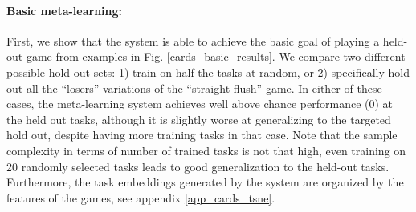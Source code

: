 \documentclass{article}
\begin{document}
\paragraph{Basic meta-learning:} First, we show that the system is able to achieve the basic goal of playing a held-out game from examples in Fig. \ref{cards_basic_results}. We compare two different possible hold-out sets: 1) train on half the tasks at random, or 2) specifically hold out all the ``losers'' variations of the ``straight flush'' game. In either of these cases, the meta-learning system achieves well above chance performance (0) at the held out tasks, although it is slightly worse at generalizing to the targeted hold out, despite having more training tasks in that case. Note that the sample complexity in terms of number of trained tasks is not that high, even training on 20 randomly selected tasks leads to good generalization to the held-out tasks. Furthermore, the task embeddings generated by the system are organized by the features of the games, see appendix \ref{app_cards_tsne}. \par
\vspace{-0.7em}
\end{document}
